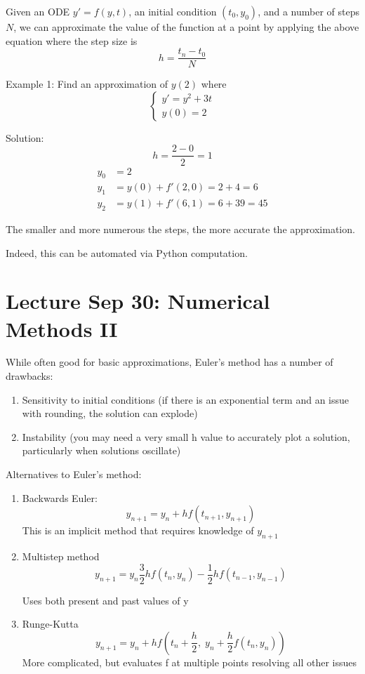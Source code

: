\documentclass[12pt]{article}
\begin{document}
Given an ODE $y' = f(y, t)$, an initial condition $(t_0, y_0)$, and a number of steps $N$, we can approximate the value of the function at a point by applying the above equation where the step size is  
\[h = \frac{t_n - t_0}{N}\] 

Example 1: Find an approximation of $y(2)$ where 
\[\begin{cases}
    y' = y^2 + 3t\\
    y(0) = 2
\end{cases}\]

Solution:
\[h = \frac{2 - 0}{2} = 1\]
\begin{align*}
    y_0 &= 2\\
    y_1 &= y(0) + f'(2, 0) = 2 + 4 = 6\\
    y_2 &= y(1) + f'(6, 1) = 6 + 39 = 45
\end{align*}

The smaller and more numerous the steps, the more accurate the approximation. 

Indeed, this can be automated via Python computation. 

\section{Lecture Sep 30: Numerical Methods II}
While often good for basic approximations, Euler's method has a number of drawbacks:
\begin{enumerate}
    \item Sensitivity to initial conditions (if there is an exponential term and an issue with rounding, the solution can explode)
    \item Instability (you may need a very small h value to accurately plot a solution, particularly when solutions oscillate)
\end{enumerate}

Alternatives to Euler's method: 
\begin{enumerate}
    \item Backwards Euler:
    \[y_{n+1} = y_n + hf(t_{n + 1}, y_{n + 1})\]
    This is an implicit method that requires knowledge of $y_{n + 1}$

    \item Multistep method 
    \[y_{n+1} = y_n \frac{3}{2}hf(t_n, y_n) - \frac{1}{2}hf(t_{n - 1}, y_{n -1})\] 

    Uses both present and past values of y

    \item Runge-Kutta 
    \[y_{n+ 1} = y_n + hf(t_n + \frac{h}{2}, \; y_n + \frac{h}{2} f(t_n, y_n))\]
    More complicated, but evaluates f at multiple points resolving all other issues
\end{enumerate}
\end{document}
